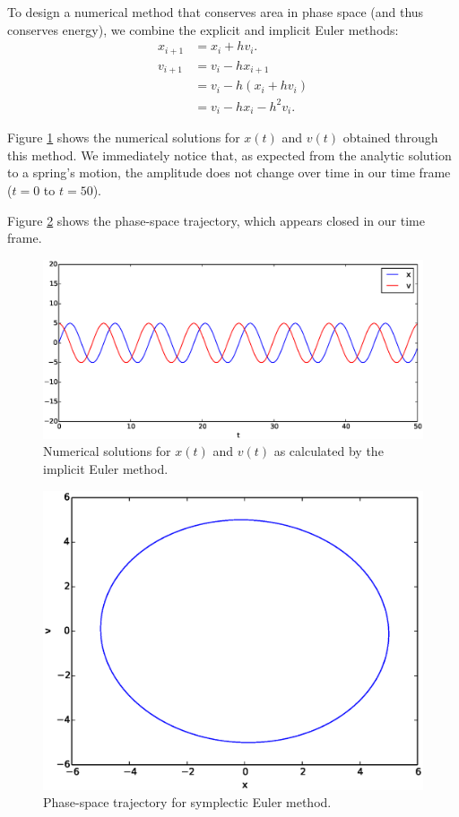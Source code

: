 \documentclass{article}
\theoremstyle{definition}
\renewcommand{\>}{\rangle}
\newcommand{\<}{\langle}
\begin{document}
To design a numerical method that conserves area in phase space (and thus conserves
energy), we combine the
explicit and implicit Euler methods:
\begin{align*}
x_{i+1} &= x_i + hv_i. \\
v_{i+1} &= v_i - hx_{i+1} \\
&= v_i - h(x_i + hv_i) \\
&= v_i - hx_i -h^2v_i.
\end{align*}

Figure \ref{fig:symplectic} shows the numerical solutions for $x(t)$ and $v(t)$ obtained
through this method. We immediately notice that, as expected from the analytic solution
to a spring's motion, the amplitude does not change over time in our time frame ($t=0$
to $t=50$).

Figure \ref{fig:symplectic_xv} shows the phase-space trajectory, which appears closed
in our time frame.

\begin{figure}
\includegraphics[width=\textwidth]{symplectic.eps}
\caption{\label{fig:symplectic} Numerical solutions for $x(t)$ and $v(t)$ as calculated
by the implicit Euler method.}
\end{figure}

\begin{figure}
\includegraphics[width=\textwidth]{symplectic_xv.eps}
\caption{\label{fig:symplectic_xv} Phase-space trajectory for symplectic Euler method.}
\end{figure}
\end{document}
